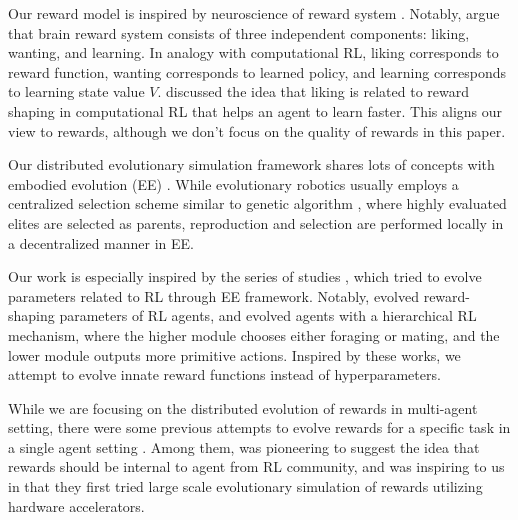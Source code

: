 Our reward model is inspired by neuroscience of reward system \citep{schultzNeuronalRewardDecision2015, berridgePleasureSystemsBrain2015}. Notably, \citet{berridgeDissectingComponentsReward2009} argue that brain reward system consists of three independent components: liking, wanting, and learning. In analogy with computational RL, liking corresponds to reward function, wanting corresponds to learned policy, and learning corresponds to learning state value $V$. \citet{dayanLikingEarlyEditable2022} discussed the idea that liking is related to reward shaping \citep{ngPolicyInvarianceReward1999} in computational RL that helps an agent to learn faster. This aligns our view to rewards, although we don't focus on the quality of rewards in this paper.

Our distributed evolutionary simulation framework shares lots of concepts with embodied evolution (EE) \citep{watsonEmbodiedEvolutionDistributing2002,bredecheEmbodiedEvolutionCollective2018}. While evolutionary robotics \citep{nolfiEvolutionaryRoboticsBiology2004} usually employs a centralized selection scheme similar to genetic algorithm \citep{mitchellIntroductionGeneticAlgorithms1998}, where highly evaluated elites are selected as parents,
reproduction and selection are performed locally in a decentralized manner in EE.

Our work is especially inspired by the series of studies \citep{elfwingBiologicallyInspiredEmbodied2005,elfwingDarwinianEmbodiedEvolution2011,elfwingEmergencePolymorphicMating2014}, which tried to evolve parameters related to RL through EE framework. Notably, \citet{elfwingDarwinianEmbodiedEvolution2011} evolved reward-shaping parameters of RL agents, and \citet{elfwingEmergencePolymorphicMating2014} evolved agents with a hierarchical RL mechanism, where the higher module chooses either foraging or mating, and the lower module outputs more primitive actions. Inspired by these works, we attempt to evolve innate reward functions instead of hyperparameters.

While we are focusing on the distributed evolution of rewards in multi-agent setting, there were some previous attempts to evolve rewards for a specific task in a single agent setting \citep{singhWhereRewardsCome2009,niekumEvolutionRewardFunctions2011,zhengWhatCanLearned2020}. Among them, \citet{singhWhereRewardsCome2009} was pioneering to suggest the idea that rewards should be internal to agent from RL community, and \citet{zhengWhatCanLearned2020} was inspiring to us in that they first tried large scale evolutionary simulation of rewards utilizing hardware accelerators.

